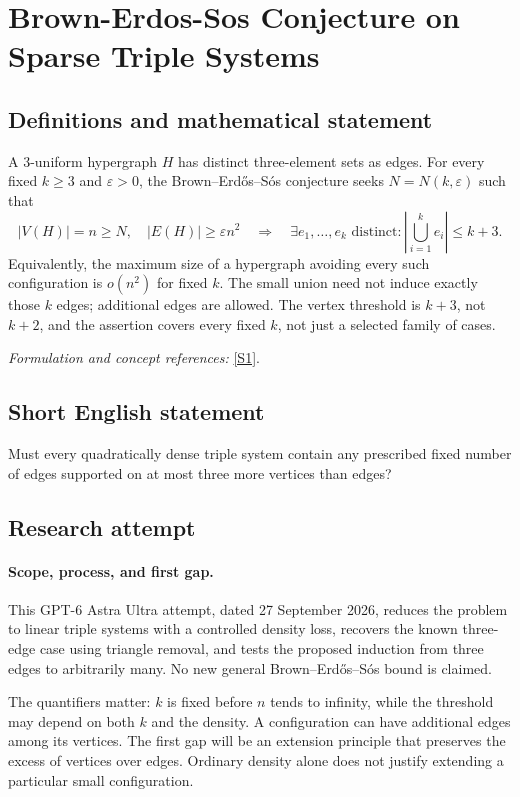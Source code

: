 \documentclass[11pt]{article}
\begin{document}
\section*{\texorpdfstring{Brown-Erdos-Sos Conjecture on Sparse Triple Systems}{Brown-Erdos-Sos Conjecture on Sparse Triple Systems}}\label{statement}
\subsection{Definitions and mathematical statement}
A $3$-uniform hypergraph $H$ has distinct three-element sets as edges. For every fixed $k\ge3$ and ${\varepsilon}>0$, the Brown--Erd\H{o}s--S\'os conjecture seeks $N=N(k,{\varepsilon})$ such that
\[
 |V(H)|=n\ge N,\quad |E(H)|\ge{\varepsilon} n^2
 \quad\Longrightarrow\quad
 \exists e_1,\ldots,e_k\text{ distinct}:\left|\bigcup_{i=1}^k e_i\right|\le k+3.
\]
Equivalently, the maximum size of a hypergraph avoiding every such configuration is $o(n^2)$ for fixed $k$. The small union need not induce exactly those $k$ edges; additional edges are allowed. The vertex threshold is $k+3$, not $k+2$, and the assertion covers every fixed $k$, not just a selected family of cases.
\par\smallskip\textit{Formulation and concept references:} \href{https://www.math.tau.ac.il/~asafico/bes.pdf}{[S1]}.

\subsection{Short English statement}
Must every quadratically dense triple system contain any prescribed fixed number of edges supported on at most three more vertices than edges?
\subsection{Research attempt}
\paragraph{Scope, process, and first gap.}
This GPT-6 Astra Ultra attempt, dated 27 September 2026, reduces the problem to linear triple systems with a controlled density loss, recovers the known three-edge case using triangle removal, and tests the proposed induction from three edges to arbitrarily many. No new general Brown--Erd\H{o}s--S\'os bound is claimed.

The quantifiers matter: $k$ is fixed before $n$ tends to infinity, while the threshold may depend on both $k$ and the density. A configuration can have additional edges among its vertices. The first gap will be an extension principle that preserves the excess of vertices over edges. Ordinary density alone does not justify extending a particular small configuration.
\end{document}
